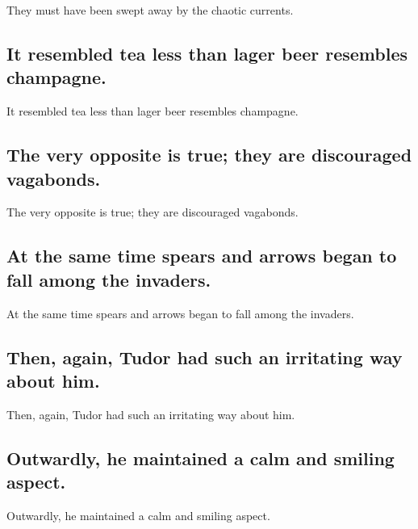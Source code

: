 \documentclass[]{article}
\begin{document}
They must have been swept away by the chaotic currents.

\hypertarget{it-resembled-tea-less-than-lager-beer-resembles-champagne.}{%
\subsection{It resembled tea less than lager beer resembles
champagne.}\label{it-resembled-tea-less-than-lager-beer-resembles-champagne.}}

It resembled tea less than lager beer resembles champagne.

\hypertarget{the-very-opposite-is-true-they-are-discouraged-vagabonds.}{%
\subsection{The very opposite is true; they are discouraged
vagabonds.}\label{the-very-opposite-is-true-they-are-discouraged-vagabonds.}}

The very opposite is true; they are discouraged vagabonds.

\hypertarget{at-the-same-time-spears-and-arrows-began-to-fall-among-the-invaders.}{%
\subsection{At the same time spears and arrows began to fall among the
invaders.}\label{at-the-same-time-spears-and-arrows-began-to-fall-among-the-invaders.}}

At the same time spears and arrows began to fall among the invaders.

\hypertarget{then-again-tudor-had-such-an-irritating-way-about-him.}{%
\subsection{Then, again, Tudor had such an irritating way about
him.}\label{then-again-tudor-had-such-an-irritating-way-about-him.}}

Then, again, Tudor had such an irritating way about him.

\hypertarget{outwardly-he-maintained-a-calm-and-smiling-aspect.}{%
\subsection{Outwardly, he maintained a calm and smiling
aspect.}\label{outwardly-he-maintained-a-calm-and-smiling-aspect.}}

Outwardly, he maintained a calm and smiling aspect.
\end{document}
